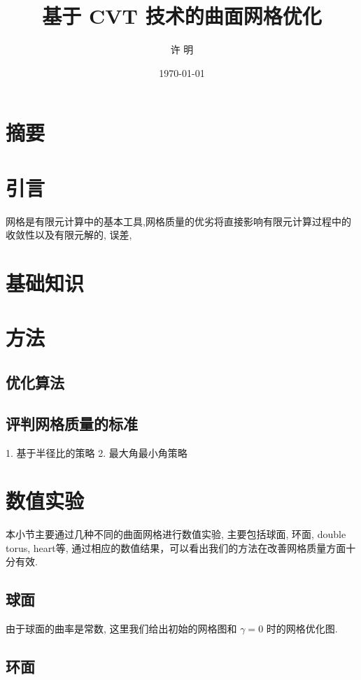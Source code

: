 \documentclass{article}
\begin{document}
\title{基于 CVT 技术的曲面网格优化}
\author{许  明}
\date{\today}
\maketitle
\tableofcontents
\section{摘要}
\section{引言}

网格是有限元计算中的基本工具,网格质量的优劣将直接影响有限元计算过程中的收敛性以及有限元解的, 
误差,

\section{基础知识}

\section{方法}

\subsection{优化算法}
\subsection{评判网格质量的标准}
1. 基于半径比的策略
2. 最大角最小角策略

\section{数值实验}

本小节主要通过几种不同的曲面网格进行数值实验, 主要包括球面, 环面, double torus,
heart等, 通过相应的数值结果，可以看出我们的方法在改善网格质量方面十分有效.

\subsection{球面}



由于球面的曲率是常数, 这里我们给出初始的网格图和 $\gamma=0$ 时的网格优化图.
\subsection{环面}
\end{document}

